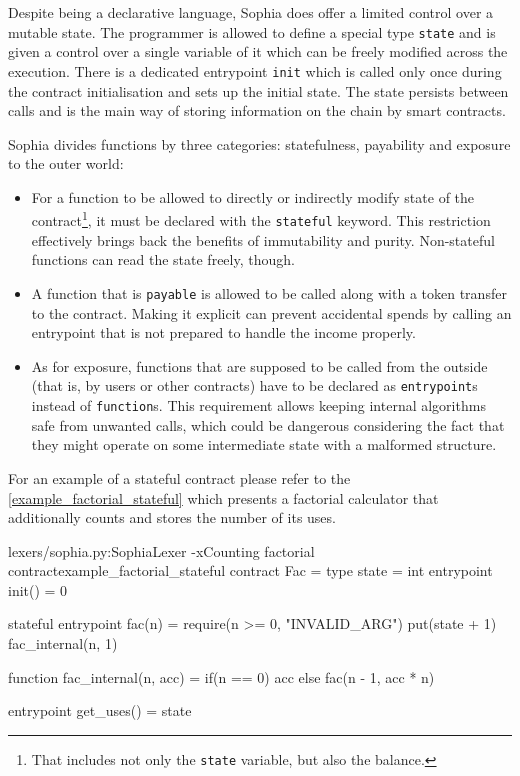 Despite being a declarative language, Sophia does offer a limited control over a
mutable state. The programmer is allowed to define a special type \texttt{state}
and is given a control over a single variable of it which can be freely modified
across the execution. There is a dedicated entrypoint \texttt{init} which is
called only once during the contract initialisation and sets up the initial
state. The state persists between calls and is the main way of storing
information on the chain by smart contracts.

Sophia divides functions by three categories: statefulness, payability and
exposure to the outer world:

\begin{itemize}
\item For a function to be allowed to directly or indirectly modify state of the
  contract\footnote{That includes not only the \texttt{state} variable, but also
    the balance.}, it must be declared with the \texttt{stateful} keyword. This
  restriction effectively brings back the benefits of immutability and purity.
  Non-stateful functions can read the state freely, though.
\item A function that is \texttt{payable} is allowed to be called along with a
  token transfer to the contract. Making it explicit can prevent accidental
  spends by calling an entrypoint that is not prepared to handle the income
  properly.
\item As for exposure, functions that are supposed to be called from the outside
  (that is, by users or other contracts) have to be declared as
  \texttt{entrypoint}s instead of \texttt{function}s. This requirement allows
  keeping internal algorithms safe from unwanted calls, which could be dangerous
  considering the fact that they might operate on some intermediate state with a
  malformed structure.
\end{itemize}

For an example of a stateful contract please refer to the
\autoref{example_factorial_stateful} which presents a factorial calculator that
additionally counts and stores the number of its uses.

\begin{code}[htb]{lexers/sophia.py:SophiaLexer -x}{Counting factorial contract}{example_factorial_stateful}
contract Fac =
  type state = int
  entrypoint init() = 0

  stateful entrypoint fac(n) =
    require(n >= 0, "INVALID_ARG")
    put(state + 1)
    fac_internal(n, 1)

  function fac_internal(n, acc) =
    if(n == 0) acc
    else fac(n - 1, acc * n)

  entrypoint get_uses() = state
\end{code}

